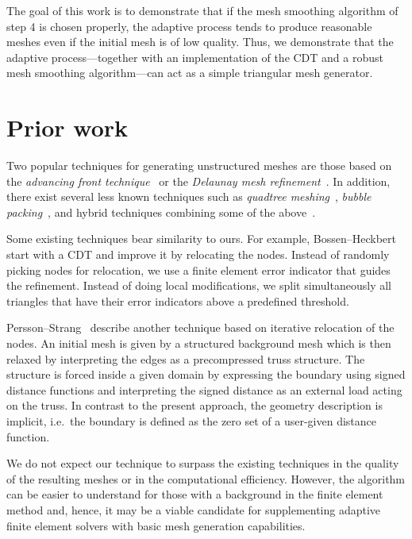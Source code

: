 \documentclass[11pt]{article}
\begin{document}
The goal of this work is to demonstrate that if the mesh smoothing algorithm of
step 4 is chosen properly, the adaptive process tends to produce reasonable
meshes even if the initial mesh is of low quality.  Thus, we demonstrate that
the adaptive process---together with an implementation of the CDT and a robust
mesh smoothing algorithm---can act as a simple triangular mesh generator.

\section{Prior work}
\label{sec:org7798f6d}

Two popular techniques for generating unstructured meshes are those based on the
\emph{advancing front technique}~\cite{L_hner_1988} or the \emph{Delaunay mesh
refinement}~\cite{Chew_1989, Ruppert_1995, Shewchuk_2002}.  In addition, there
exist several less known techniques such as \emph{quadtree
meshing}~\cite{Yerry_1983}, \emph{bubble packing}~\cite{Shimada_1995}, and
hybrid techniques combining some of the above~\cite{mavriplis1995advancing}.

Some existing techniques bear similarity to ours.  For example,
Bossen--Heckbert~\cite{bossen1996pliant} start with a CDT and improve it by
relocating the nodes.  Instead of randomly picking nodes for relocation, we use
a finite element error indicator that guides the refinement.  Instead of doing
local modifications, we split simultaneously all triangles that have their error
indicators above a predefined threshold.

Persson--Strang~\cite{persson2004simple} describe another technique based on
iterative relocation of the nodes.  An initial mesh is given by a structured
background mesh which is then relaxed by interpreting the edges as a
precompressed truss structure.  The structure is forced inside a given domain by
expressing the boundary using signed distance functions and interpreting the
signed distance as an external load acting on the truss.  In contrast to the
present approach, the geometry description is implicit, i.e.~the boundary is
defined as the zero set of a user-given distance function.

We do not expect our technique to surpass the existing techniques in the quality
of the resulting meshes or in the computational efficiency.  However, the
algorithm can be easier to understand for those with a background in the finite
element method and, hence, it may be a viable candidate for supplementing
adaptive finite element solvers with basic mesh generation capabilities.
\end{document}
